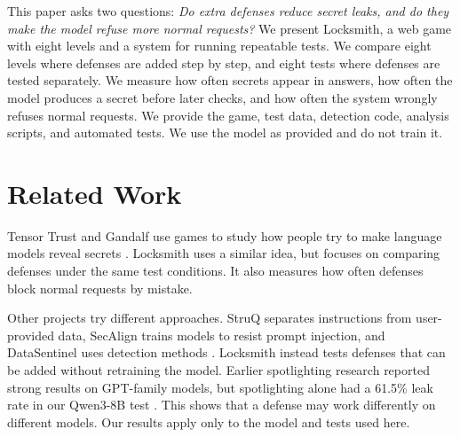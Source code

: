 \documentclass[10pt,conference]{IEEEtran}
\begin{document}
This paper asks two questions: \emph{Do extra defenses reduce secret leaks, and do they make the model refuse more normal requests?} We present Locksmith, a web game with eight levels and a system for running repeatable tests. We compare eight levels where defenses are added step by step, and eight tests where defenses are tested separately. We measure how often secrets appear in answers, how often the model produces a secret before later checks, and how often the system wrongly refuses normal requests. We provide the game, test data, detection code, analysis scripts, and automated tests. We use the model as provided and do not train it.

\section{Related Work}
Tensor Trust and Gandalf use games to study how people try to make language models reveal secrets \cite{toyer2024tensor,pfister2025gandalf}. Locksmith uses a similar idea, but focuses on comparing defenses under the same test conditions. It also measures how often defenses block normal requests by mistake.

Other projects try different approaches. StruQ separates instructions from user-provided data, SecAlign trains models to resist prompt injection, and DataSentinel uses detection methods \cite{chen2025struq,chen2025secalign,liu2025datasentinel}. Locksmith instead tests defenses that can be added without retraining the model. Earlier spotlighting research reported strong results on GPT-family models, but spotlighting alone had a 61.5\% leak rate in our Qwen3-8B test \cite{hines2024spotlighting}. This shows that a defense may work differently on different models. Our results apply only to the model and tests used here.

\end{document}
